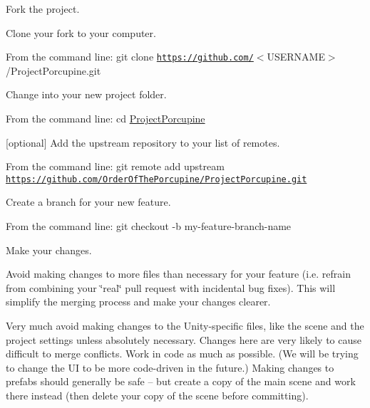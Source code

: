 \begin{DoxyEnumerate}
\item Fork the project.
\item Clone your fork to your computer.
\begin{DoxyItemize}
\item From the command line\+: {\ttfamily git clone \href{https://github.com/}{\tt https\+://github.\+com/}$<$U\+S\+E\+R\+N\+A\+ME$>$/\+Project\+Porcupine.git}
\end{DoxyItemize}
\item Change into your new project folder.
\begin{DoxyItemize}
\item From the command line\+: {\ttfamily cd \hyperlink{namespace_project_porcupine}{Project\+Porcupine}}
\end{DoxyItemize}
\item \mbox{[}optional\mbox{]} Add the upstream repository to your list of remotes.
\begin{DoxyItemize}
\item From the command line\+: {\ttfamily git remote add upstream \href{https://github.com/OrderOfThePorcupine/ProjectPorcupine.git}{\tt https\+://github.\+com/\+Order\+Of\+The\+Porcupine/\+Project\+Porcupine.\+git}}
\end{DoxyItemize}
\item Create a branch for your new feature.
\begin{DoxyItemize}
\item From the command line\+: {\ttfamily git checkout -\/b my-\/feature-\/branch-\/name}
\end{DoxyItemize}
\item Make your changes.
\begin{DoxyItemize}
\item Avoid making changes to more files than necessary for your feature (i.\+e. refrain from combining your \char`\"{}real\char`\"{} pull request with incidental bug fixes). This will simplify the merging process and make your changes clearer.
\item Very much avoid making changes to the Unity-\/specific files, like the scene and the project settings unless absolutely necessary. Changes here are very likely to cause difficult to merge conflicts. Work in code as much as possible. (We will be trying to change the UI to be more code-\/driven in the future.) Making changes to prefabs should generally be safe -- but create a copy of the main scene and work there instead (then delete your copy of the scene before committing).

\end{DoxyItemize}
\end{DoxyEnumerate}
